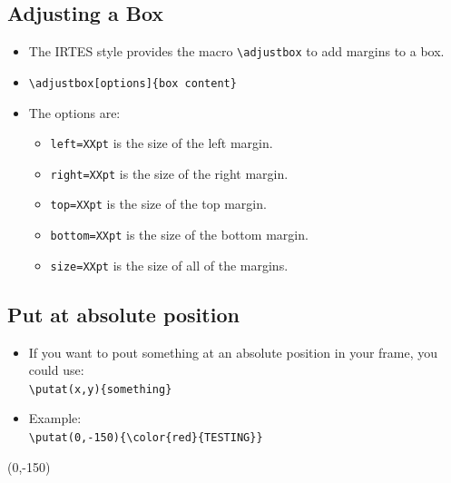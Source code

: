 \documentclass[english,circlenumberstyle]{irtesbeamer}
\begin{document}
\subsection{Adjusting a Box}
\begin{frame}{\subsecname}
	\begin{itemize}
	\item The IRTES style provides the macro \texttt{{\textbackslash}adjustbox} to add margins to a box.
	\item \texttt{{\textbackslash}adjustbox[options]\{box content\}}
	\item The options are:
		\begin{itemize}
		\item \texttt{left=XXpt} is the size of the left margin.
		\item \texttt{right=XXpt} is the size of the right margin.
		\item \texttt{top=XXpt} is the size of the top margin.
		\item \texttt{bottom=XXpt} is the size of the bottom margin.
		\item \texttt{size=XXpt} is the size of all of the margins.
		\end{itemize}
	\end{itemize}
\end{frame}

\subsection{Put at absolute position}
\begin{frame}{\subsecname}
	\begin{itemize}
	\item If you want to pout something at an absolute position in your frame, you could use: \\
		\texttt{{\textbackslash}putat(x,y)\{something\}}
	\item Example: \\
		\texttt{{\textbackslash}putat(0,-150)\{{\textbackslash}color\{red\}\{TESTING\}\}}
	\end{itemize}
	\putat(0,-150){\color{red}{TESTING}}
\end{frame}
\end{document}
